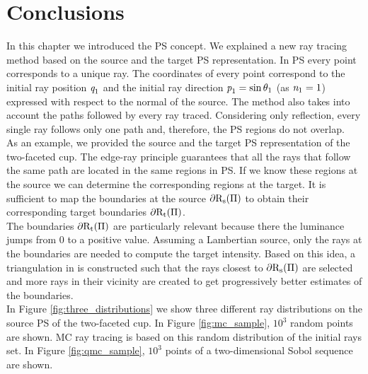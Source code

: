 \section{Conclusions}
In this chapter we introduced the PS concept. 
We explained a new ray tracing method based on the source and the target PS representation. 
In PS every point corresponds to a unique ray. 
The coordinates of every point correspond to the initial ray position $\textit{q}_1$ and the initial ray direction $\textit{p}_1 = \sin\theta_1$ (as $\textit{n}_1 = 1$) expressed with respect to the normal of the source. The method also takes into account the paths followed by every ray traced.
Considering only reflection, every single ray follows only one path and, therefore, the PS regions do not overlap. 
\\ \indent
As an example, we provided the source and the target PS representation of the two-faceted cup.
The edge-ray principle guarantees that all the rays that follow the same path are located in the same regions in PS. If we know these regions at the source we can determine the corresponding regions at the target. 
It is sufficient to map the boundaries at the source $\partial\mbox{$\textup{R}$}_\textrm{s}(\Pi)$ to obtain their corresponding target boundaries $\partial\mbox{$\textup{R}$}_\textrm{t}(\Pi)$. \\ \indent
The boundaries $\partial\mbox{$\textup{R}$}_\textrm{t}(\Pi)$ are particularly relevant because there the luminance jumps from $0$ to a positive value. 
Assuming a Lambertian source, only the rays at the boundaries are needed to compute the target intensity. 
Based on this idea, a triangulation in  is constructed such that the rays closest to $\partial\mbox{$\textup{R}$}_\textrm{s}(\Pi)$
are selected and more rays in their vicinity are created to get progressively better estimates of the boundaries.
\\ \indent In Figure \ref{fig:three_distributions} we show three different ray distributions on the source PS of the two-faceted cup. In Figure \ref{fig:mc_sample}, $10^3$ random points are shown. MC ray tracing is based on this random distribution of the initial rays set. In Figure \ref{fig:qmc_sample}, $10^3$ points of a two-dimensional Sobol sequence are shown. 
